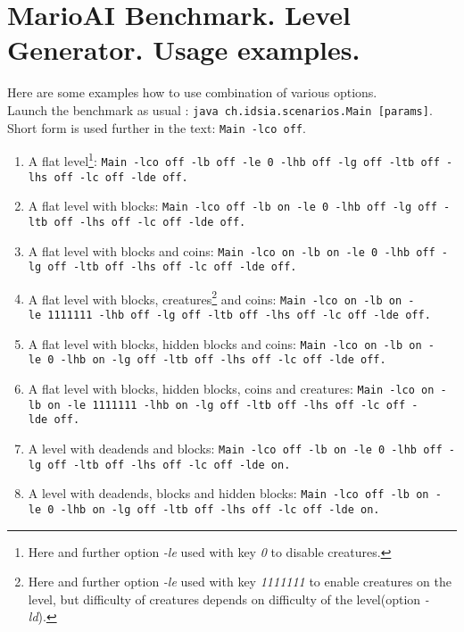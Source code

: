 \documentclass{report}
\begin{document}
\section*{MarioAI Benchmark. Level Generator. Usage examples.}
Here are some examples how to use combination of various options. \\
Launch the benchmark as usual : \texttt{java~ch.idsia.scenarios.Main [params]}. \\ Short form is used further in the text: \texttt{Main -lco off}.
\begin{enumerate}
\item A flat level\footnote{Here and further option \emph{-le} used with key \emph{0} to disable creatures.}: \newline %
\texttt{Main~-lco~off~-lb~off~-le~0~-lhb~off~-lg~off~-ltb~off~-lhs~off~-lc~off~-lde~off.}
\item A flat level with blocks:\newline %
\texttt{Main~-lco~off~-lb~on~-le~0~-lhb~off~-lg~off~-ltb~off~-lhs~off~-lc~off~-lde~off.}
\item A flat level with blocks and coins:\newline %
\texttt{Main~-lco~on~-lb~on~-le~0~-lhb~off~-lg~off~-ltb~off~-lhs~off~-lc~off~-lde~off.}
\item A flat level with blocks, creatures\footnote{Here and further option \emph{-le} used with key \emph{1111111} to enable creatures on the level, but difficulty of creatures depends on difficulty of the level(option \emph{-ld}).} and coins:\newline %
\texttt{Main~-lco~on~-lb~on~-le~1111111~-lhb~off~-lg~off~-ltb~off~-lhs~off~-lc~off~-lde~off.}
\item A flat level with blocks, hidden blocks and coins:\newline %
\texttt{Main~-lco~on~-lb~on~-le~0~-lhb~on~-lg~off~-ltb~off~-lhs~off~-lc~off~-lde~off.}
\item A flat level with blocks, hidden blocks, coins and creatures:\newline %
\texttt{Main~-lco~on~-lb~on~-le~1111111~-lhb~on~-lg~off~-ltb~off~-lhs~off~-lc~off~-lde~off.}
\item A level with deadends  and blocks:\newline %
\texttt{Main~-lco~off~-lb~on~-le~0~-lhb~off~-lg~off~-ltb~off~-lhs~off~-lc~off~-lde~on.}
\item A level with deadends, blocks and hidden blocks:\newline %
\texttt{Main~-lco~off~-lb~on~-le~0~-lhb~on~-lg~off~-ltb~off~-lhs~off~-lc~off~-lde~on.}

\end{enumerate}
\end{document}
